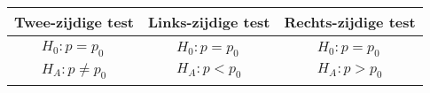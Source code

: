 \documentclass[a5paper]{article}
\begin{document}
\begin{center}
\begin{tabular}{|c|c|c|}
\hline
\textbf{Twee-zijdige test} & \textbf{Links-zijdige test} & \textbf{Rechts-zijdige test} \\
\hline
$\begin{array}{l}
H_0 : p = p_0 \\
H_A : p \ne p_0
\end{array}$ &
$\begin{array}{l}
H_0 : p = p_0 \\
H_A : p < p_0
\end{array}$ &
$\begin{array}{l}
H_0 : p = p_0 \\
H_A : p > p_0
\end{array}$ \\
\hline


\end{tabular}
\end{center}
\end{document}
